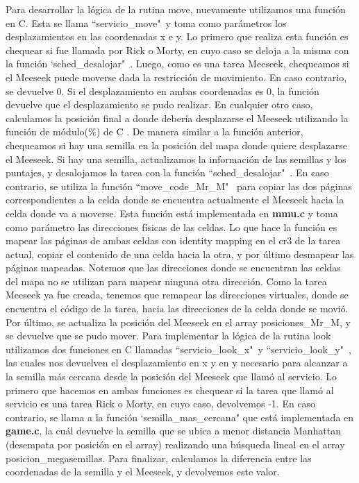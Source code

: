 \documentclass[a4paper]{article}
\begin{document}
Para desarrollar la lógica de la rutina move, nuevamente utilizamos una función en C. Esta se llama ``servicio_move"\ y toma como parámetros los desplazamientos en las coordenadas x e y. Lo primero que realiza esta función es chequear si fue llamada por Rick o Morty, en cuyo caso se deloja a la misma con la función `sched_desalojar"\ . Luego, como es una tarea Meeseek, chequeamos si el Meeseek puede moverse dada la restricción de movimiento. En caso contrario, se devuelve 0. Si el desplazamiento en ambas coordenadas es 0, la función devuelve que el desplazamiento se pudo realizar. En cualquier otro caso, calculamos la posición final a donde debería desplazarse el Meeseek utilizando la función de módulo(\%) de C . De manera similar a la función anterior, chequeamos si hay una semilla en la posición del mapa donde quiere desplazarse el Meeseek. Si hay una semilla, actualizamos la información de las semillas y los puntajes, y desalojamos la tarea con la función ``sched_desalojar"\ . En caso contrario, se utiliza la función ``move_code_Mr_M" \ para copiar las dos páginas correspondientes a la celda donde se encuentra actualmente el Meeseek hacia la celda donde va a moverse. Esta función está implementada en \textbf{mmu.c} y toma como parámetro las direcciones físicas de las celdas. Lo que hace la función es mapear las páginas de ambas celdas con identity mapping en el cr3 de la tarea actual, copiar el contenido de una celda hacia la otra, y por último desmapear las páginas mapeadas. Notemos que las direcciones donde se encuentran las celdas del mapa no se utilizan para mapear ninguna otra dirección. Como la tarea Meeseek ya fue creada, tenemos que remapear las direcciones virtuales, donde se encuentra el código de la tarea, hacia las direcciones de la celda donde se movió. Por último, se actualiza la posición del Meeseek en el array posiciones_Mr_M, y se devuelve que se pudo mover.
\justify
Para implementar la lógica de la rutina look utilizamos dos funciones en C llamadas ``servicio_look_x"\ y ``servicio_look_y"\ , las cuales nos devuelven el desplazamiento en x y en y necesario para alcanzar a la semilla más cercana desde la posición del Meeseek que llamó al servicio. Lo primero que hacemos en ambas funciones es chequear si la tarea que llamó al servicio es una tarea Rick o Morty, en cuyo caso, devolvemos -1. En caso contrario, se llama a la función `semilla_mas_cercana" que está implementada en \textbf{game.c}, la cuál devuelve la semilla que se ubica a menor distancia Manhattan (desempata por posición en el array) realizando una búsqueda lineal en el array posicion_megasemillas. Para finalizar, calculamos la diferencia entre las coordenadas de la semilla y el Meeseek, y devolvemos este valor.
\end{document}
